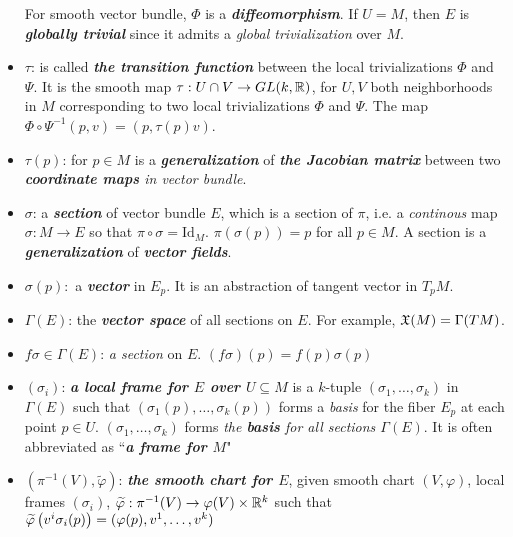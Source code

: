 \documentclass[11pt]{article}
\begin{document}
\begin{itemize}
For smooth vector bundle, $\Phi$ is a \emph{\textbf{diffeomorphism}}. If $U = M$, then $E$ is \emph{\textbf{globally trivial}} since it admits a \emph{global trivialization} over $M$.

\item $\tau$: \quad is called \emph{\textbf{the transition function}} between the local trivializations $\Phi$ and $\Psi$.  It is the smooth map $\tau: U\cap V \rightarrow GL(k, {\mathbb R})$, for $U, V$ both neighborhoods in $M$ corresponding to two  local trivializations $\Phi$ and $\Psi$. The map $\Phi \circ \Psi^{-1}(p, v) = (p, \tau(p)v)$.

\item $\tau(p)$: \quad for $p\in M$ is a \emph{\textbf{generalization}} of \emph{\textbf{the Jacobian matrix}} between two \emph{\textbf{coordinate maps} in vector bundle}.  

\item $\sigma$: \quad a \emph{\textbf{section}} of vector bundle $E$, which is a section of $\pi$, i.e. a \emph{continous} map $\sigma: M \rightarrow E$ so that $\pi \circ \sigma = \text{Id}_{M}$. $\pi(\sigma(p)) = p$ for all $p\in M$. A section is a \emph{\textbf{generalization}} of \emph{\textbf{vector fields}}.

\item $\sigma(p):$ \quad a \emph{\textbf{vector}} in $E_p$. It is an abstraction of tangent vector in $T_pM$.

\item $\Gamma(E)$: \quad the \emph{\textbf{vector space}} of all sections on $E$.  For example, ${\mathfrak X}(M)= \Gamma(TM)$.

\item $f\sigma \in \Gamma(E)$: \quad  \emph{a section} on $E$. $(f\sigma)(p) = f(p)\sigma(p)$

\item $(\sigma_i)$: \quad \emph{\textbf{a local frame for $E$ over $U \subseteq M$}} is a $k$-tuple $(\sigma_1, \ldots, \sigma_k)$ in $\Gamma(E)$ such that $(\sigma_1(p), \ldots, \sigma_k(p))$ forms a \emph{basis} for the fiber $E_p$ at each point $p \in U$. $(\sigma_1, \ldots, \sigma_k)$ forms \emph{the \textbf{basis} for all sections $\Gamma(E)$}.   It is often abbreviated as ``\emph{\textbf{a frame for $M$}}"

\item $(\pi^{-1}(V), \widetilde{\varphi})$: \quad \emph{\textbf{the smooth chart for $E$}}, given smooth chart $(V, \varphi)$, local frames $(\sigma_i)$, $\widetilde{\varphi}: \pi^{-1}(V) \rightarrow \varphi(V) \times {\mathbb R}^{k}$ such that $\widetilde{\varphi}\left(v^i \sigma_i(p)\right) = (\varphi(p), v^1, \ldots, v^k)$
\end{itemize}
\end{document}
